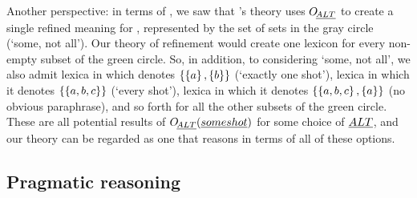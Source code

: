 \documentclass[leqno]{article}
\begin{document}
Another perspective: in terms of , we saw that
\CFS's theory uses $\mathop{O\negthinspace_{\emph{ALT}}}$ to create a single refined meaning for
, represented by the set of sets in the gray circle
(`some, not all'). Our theory of refinement would create one lexicon
for every non-empty subset of the green circle. So, in addition, to
considering `some, not all', we also admit lexica in which  denotes $\left\{ \left\{ a \right\}, \left\{ b \right\} \right\}$ (`exactly one shot'),
lexica in which it denotes $\left\{ \left\{ a,b,c \right\} \right\}$ (`every shot'), lexica
in which it denotes $\left\{ \left\{ a,b,c \right\},\left\{ a \right\} \right\}$ (no obvious
paraphrase), and so forth for all the other subsets of the green
circle. These are all potential results of $\mathop{O\negthinspace_{\emph{ALT}}}(\emph{some shot})$
for some choice of $\emph{ALT}$, and our theory can be regarded as one that
reasons in terms of all of these options.


\subsection{Pragmatic reasoning}\label{sec:agents}
\end{document}
